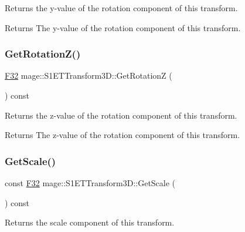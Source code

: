 Returns the y-\/value of the rotation component of this transform.

\begin{DoxyReturn}{Returns}
The y-\/value of the rotation component of this transform. 
\end{DoxyReturn}
\mbox{\label{classmage_1_1_s1_e_t_transform3_d_a1ed23da5316deb3bdb5704b07c6863f2}} 
\subsubsection{\texorpdfstring{Get\+Rotation\+Z()}{GetRotationZ()}}
{\footnotesize\ttfamily \mbox{\hyperlink{namespacemage_aa97e833b45f06d60a0a9c4fc22ae02c0}{F32}} mage\+::\+S1\+E\+T\+Transform3\+D\+::\+Get\+RotationZ (\begin{DoxyParamCaption}{ }\end{DoxyParamCaption}) const\hspace{0.3cm}{\ttfamily [noexcept]}}

Returns the z-\/value of the rotation component of this transform.

\begin{DoxyReturn}{Returns}
The z-\/value of the rotation component of this transform. 
\end{DoxyReturn}
\mbox{\label{classmage_1_1_s1_e_t_transform3_d_a3039b877cf01b6ce1ca12f5eab0319ae}} 
\subsubsection{\texorpdfstring{Get\+Scale()}{GetScale()}}
{\footnotesize\ttfamily const \mbox{\hyperlink{namespacemage_aa97e833b45f06d60a0a9c4fc22ae02c0}{F32}} mage\+::\+S1\+E\+T\+Transform3\+D\+::\+Get\+Scale (\begin{DoxyParamCaption}{ }\end{DoxyParamCaption}) const\hspace{0.3cm}{\ttfamily [noexcept]}}

Returns the scale component of this transform.

